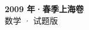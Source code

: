 \documentclass[zihao=-4, a4paper]{ctexart}
\begin{document}
\begin{center}
  {\Large\bfseries 2009 年·春季上海卷}\\[4pt]
  {\large 数学 · 试题版}
\end{center}
\medskip
{}

\end{document}

